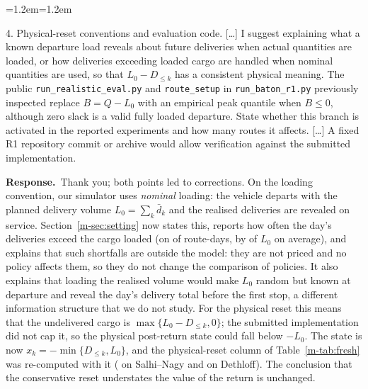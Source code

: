 \documentclass[11pt]{article}
\newenvironment{comment}{\par\medskip\noindent\color{rev}\itshape
  \begin{list}{}{\leftmargin=1.2em\rightmargin=1.2em}\item[]}%
  {\end{list}\par}
\newcommand{\resp}{\par\noindent\textbf{Response.}\ }
\newcommand{\sref}[1]{Section~\ref{m-#1}}
\newcommand{\tref}[1]{Table~\ref{m-#1}}
\begin{document}
\begin{comment}
4. Physical-reset conventions and evaluation code. [\ldots] I suggest
explaining what a known departure load reveals about future deliveries
when actual quantities are loaded, or how deliveries exceeding loaded
cargo are handled when nominal quantities are used, so that
$L_0 - D_{\le k}$ has a consistent physical meaning. The public
\texttt{run\_realistic\_eval.py} and \texttt{route\_setup} in
\texttt{run\_baton\_r1.py} previously inspected replace $B = Q - L_0$
with an empirical peak quantile when $B \le 0$, although zero slack is a
valid fully loaded departure. State whether this branch is activated in
the reported experiments and how many routes it affects. [\ldots] A
fixed R1 repository commit or archive would allow verification against
the submitted implementation.
\end{comment}
\resp Thank you; both points led to corrections. On the loading
convention, our simulator uses \emph{nominal} loading: the vehicle
departs with the planned delivery volume $L_0 = \sum_k \bar d_k$ and the
realised deliveries are revealed on service. \sref{sec:setting} now
states this, reports how often the day's deliveries exceed the cargo
loaded (on \stockoutAll{} of route-days, by \stockoutExcess{} of $L_0$ on
average), and explains that such shortfalls are outside the model:
they are not priced and no policy affects them, so they do not change
the comparison of policies. It also explains that loading the realised
volume would make $L_0$ random but known at departure and reveal the
day's delivery total before the first stop, a different information
structure that we do not study. For the physical reset this means that
the undelivered cargo is $\max\{L_0 - D_{\le k}, 0\}$; the submitted
implementation did not cap it, so the physical post-return state could
fall below $-L_0$. The state is now $x_k = -\min\{D_{\le k}, L_0\}$, and
the physical-reset column of \tref{tab:fresh} was re-computed with it
(\frSalhiExact{} on Salhi--Nagy and \frDethExact{} on Dethloff). The
conclusion that the conservative reset understates the value of the
return is unchanged.
\end{document}
